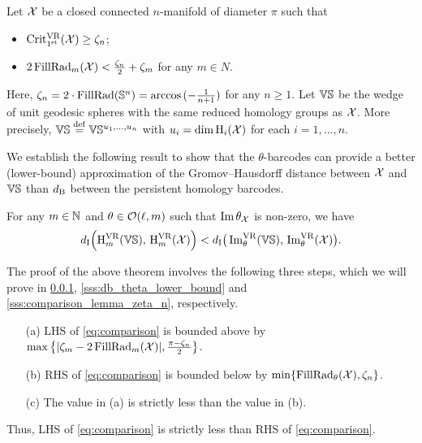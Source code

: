 \label{ss:genberal_distance_comparison}

Let $\mathcal{X}$ be a closed connected \(n\)-manifold of diameter $\pi$ such that 
\begin{itemize}
    \item $\operatorname{Crit^{\mathrm{VR}}_{1^{\mathrm{st}}}}(\mathcal{X}) \geq \zeta_n $;
    \item $2\operatorname{FillRad}_{m}(\mathcal{X}) < \tfrac{\zeta_n}{2}+\zeta_m$ for any $m \in N$.
\end{itemize}
Here, $\zeta_n = 2 \cdot \operatorname{FillRad}(\mathbb{S}^n)= \arccos{(-\tfrac{1}{n+1})}$ for any $n\geq 1$.
Let $\mathbb{V}\mathbb{S}$ be the wedge of unit geodesic spheres with the same reduced homology groups as $\mathcal{X}$.
More precisely, $\mathbb{V}\mathbb{S} \stackrel{\mathrm{def}}{=} \mathbb{V}\mathbb{S}^{u_1, \dots, u_n}$ with $u_i = \dim \operatorname{H}_i(\mathcal{X})$ for each $i = 1,\dots, n$.

We establish the following result to show that the $\theta$-barcodes can provide a better (lower-bound) approximation of the Gromov--Hausdorff distance between $\mathcal{X}$ and $\mathbb{V}\mathbb{S}$ than $d_{\mathrm{B}}$ between the persistent homology barcodes.

\medskip\theorem
For any $m \in \mathbb{N}$ and $\theta \in \mathcal{O}(\ell, m)$ such that $\operatorname{Im} \theta_{\mathcal{X}}$ is non-zero, we have
\begin{equation}\label{eq:comparison}
    d_{\mathrm{I}} \Big(\mathrm{H}^{\mathrm{VR}}_{m}(\mathbb{V}\mathbb{S}),\, \mathrm{H}^{\mathrm{VR}}_{m}(\mathcal{X})\Big) < d_{\mathrm{I}} \big(\operatorname{Im}^{\mathrm{VR}}_{\theta}(\mathbb{V}\mathbb{S}),\, \operatorname{Im}^{\mathrm{VR}}_{\theta}(\mathcal{X})\big) .
\end{equation}

The proof of the above theorem involves the following three steps, which we will prove in \cref{sss:db_upper_bound}, \cref{sss:db_theta_lower_bound} and \cref{sss:comparison_lemma_zeta_n}, respectively. 
\begin{enumerate}
    \item [(a)] LHS of \cref{eq:comparison} is bounded above by $\max\big\{|\zeta_m  - 2\operatorname{FillRad}_{m}(\mathcal{X}) |, \tfrac{\pi - \zeta_n}{2}\big\}$.
    \item [(b)] RHS of \cref{eq:comparison} is bounded below by $\min\{\operatorname{FillRad}_{\theta}(\mathcal{X}), \zeta_n\}$.
    \item [(c)] The value in (a) is strictly less than the value in (b).
\end{enumerate}
Thus, LHS of \cref{eq:comparison} is strictly less than RHS of \cref{eq:comparison}.

\subsubsection{}\label{sss:db_upper_bound}


